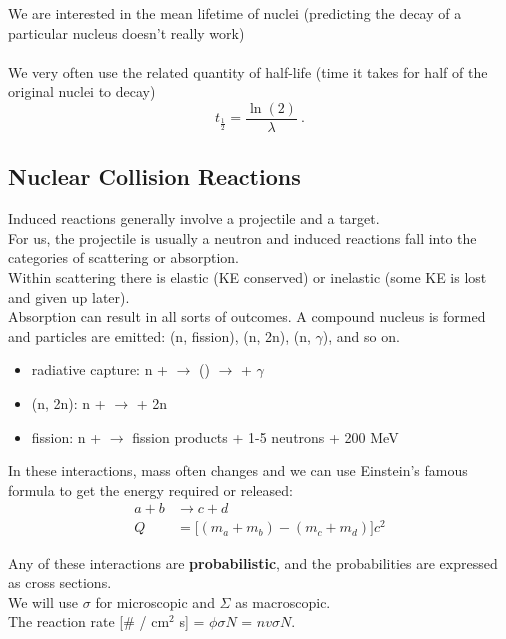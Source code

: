 \documentclass[12pt]{article}
\newif\ifeqns
\begin{document}
We are interested in the mean lifetime of nuclei (predicting the decay of a particular nucleus doesn't really work)\\
\ifeqns
\[\bar{t} \equiv \int_0^\infty dt \: t \: p(t) = \lambda \int_0^\infty dt \: t \: e^{-\lambda t} = \frac{1}{\lambda} \:. \]
\else
\vspace*{2em}\\
\fi
We very often use the related quantity of half-life (time it takes for half of the original nuclei to decay) 
\[t_{\frac{1}{2}} = \frac{\ln(2)}{\lambda} \:. \]

\subsection*{Nuclear Collision Reactions}
Induced reactions generally involve a projectile and a target. \\
For us, the projectile is usually a neutron and induced reactions fall into the categories of scattering or absorption.\\
Within scattering there is elastic (KE conserved) or inelastic (some KE is lost and given up later).\\
Absorption can result in all sorts of outcomes. 
A compound nucleus is formed and particles are emitted: (n, fission), (n, 2n), (n, $\gamma$), and so on.
%
\begin{itemize}
\item radiative capture: n +  $\rightarrow$ () $\rightarrow$  + $\gamma$
\item (n, 2n): n +  $\rightarrow$  + 2n
\item fission: n +  $\rightarrow$ fission products + 1-5 neutrons + 200 MeV
\end{itemize}

In these interactions, mass often changes and we can use Einstein's famous formula to get the energy required or released:
\begin{align*}
a + b &\rightarrow c + d\\
Q &= \bigl[ (m_a + m_b) - (m_c + m_d) \bigr]c^2
\end{align*}

Any of these interactions are \textbf{probabilistic}, and the probabilities are expressed as cross sections. \\
We will use $\sigma$ for microscopic and $\Sigma$ as macroscopic.\\
The reaction rate [\# / cm$^2$ s] = $\phi \sigma N$ = $nv \sigma N$.
\end{document}
